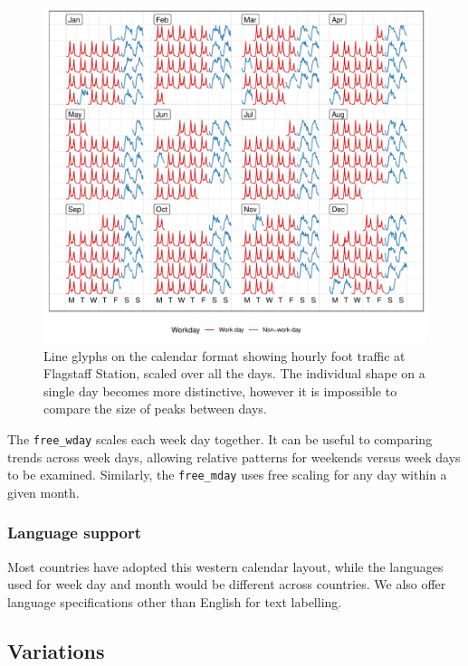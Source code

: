 \documentclass[12pt]{article}
\begin{document}
\begin{figure}

{\centering \includegraphics[width=\textwidth]{figure/fs-free-1} 

}

\caption{Line glyphs on the calendar format showing hourly foot traffic at Flagstaff Station, scaled over all the days. The individual shape on a single day becomes more distinctive, however it is impossible to compare the size of peaks between days.}\label{fig:fs-free}
\end{figure}



The \texttt{free\_wday} scales each week day together. It can be useful to comparing trends across week days, allowing relative patterns for weekends versus week days to be examined. Similarly, the \texttt{free\_mday} uses free scaling for any day within a given month.

\hypertarget{language-support}{%
\subsubsection{Language support}\label{language-support}}

Most countries have adopted this western calendar layout, while the languages used for week day and month would be different across countries. We also offer language specifications other than English for text labelling.

\hypertarget{sec:variations}{%
\subsection{Variations}\label{sec:variations}}
\end{document}
